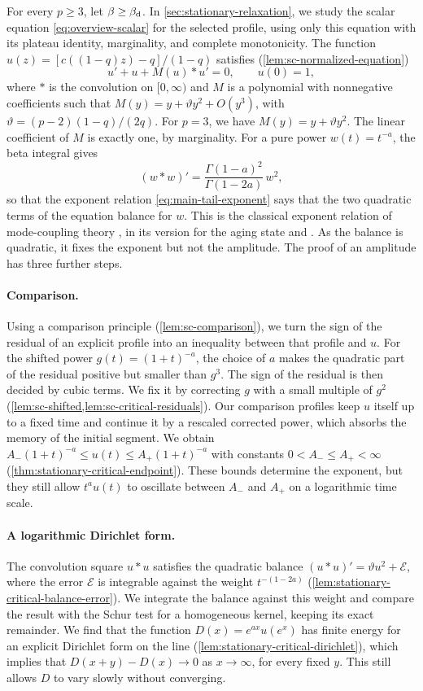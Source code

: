 For every $p\ge3$, let $\beta\ge\beta_{\mathrm d}$. In \cref{sec:stationary-relaxation}, we study the scalar equation \eqref{eq:overview-scalar} for the selected profile, using only this equation with its plateau identity, marginality, and complete monotonicity. The function $u(z)=[c((1-q)z)-q]/(1-q)$ satisfies (\cref{lem:sc-normalized-equation})
\[
 u'+u+M(u)*u'=0,\qquad u(0)=1,
\]
where $*$ is the convolution on $[0,\infty)$ and $M$ is a polynomial with nonnegative coefficients such that $M(y)=y+\vartheta y^2+O(y^3)$, with $\vartheta=(p-2)(1-q)/(2q)$. For $p=3$, we have $M(y)=y+\vartheta y^2$. The linear coefficient of $M$ is exactly one, by marginality. For a pure power $w(t)=t^{-a}$, the beta integral gives
\[
 (w*w)'=\frac{\Gamma(1-a)^2}{\Gamma(1-2a)}\,w^2 ,
\]
so that the exponent relation \eqref{eq:main-tail-exponent} says that the two quadratic terms of the equation balance for $w$. This is the classical exponent relation of mode-coupling theory \cite[Section~4, p.~881]{goetze1998}, in its version for the aging state \cite[Equation~(IV.6)]{bckm1996} and \cite{kimlatz2001}. As the balance is quadratic, it fixes the exponent but not the amplitude. The proof of an amplitude has three further steps.

\paragraph{Comparison.}
Using a comparison principle (\cref{lem:sc-comparison}), we turn the sign of the residual of an explicit profile into an inequality between that profile and $u$. For the shifted power $g(t)=(1+t)^{-a}$, the choice of $a$ makes the quadratic part of the residual positive but smaller than $g^3$. The sign of the residual is then decided by cubic terms. We fix it by correcting $g$ with a small multiple of $g^2$ (\cref{lem:sc-shifted,lem:sc-critical-residuals}). Our comparison profiles keep $u$ itself up to a fixed time and continue it by a rescaled corrected power, which absorbs the memory of the initial segment. We obtain $A_-(1+t)^{-a}\le u(t)\le A_+(1+t)^{-a}$ with constants $0<A_-\le A_+<\infty$ (\cref{thm:stationary-critical-endpoint}). These bounds determine the exponent, but they still allow $t^au(t)$ to oscillate between $A_-$ and $A_+$ on a logarithmic time scale.

\paragraph{A logarithmic Dirichlet form.}
The convolution square $u*u$ satisfies the quadratic balance $(u*u)'=\vartheta u^2+\mathcal E$, where the error $\mathcal E$ is integrable against the weight $t^{-(1-2a)}$ (\cref{lem:stationary-critical-balance-error}). We integrate the balance against this weight and compare the result with the Schur test for a homogeneous kernel, keeping its exact remainder. We find that the function $D(x)=e^{ax}u(e^x)$ has finite energy for an explicit Dirichlet form on the line (\cref{lem:stationary-critical-dirichlet}), which implies that $D(x+y)-D(x)\to0$ as $x\to\infty$, for every fixed $y$. This still allows $D$ to vary slowly without converging.

